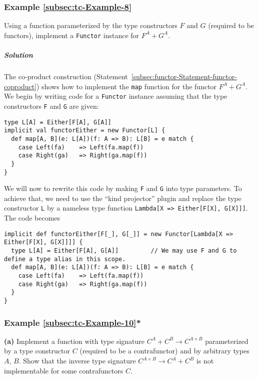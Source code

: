 \subsubsection{Example \label{subsec:tc-Example-8}\ref{subsec:tc-Example-8}}

Using a function parameterized by the type constructors $F$ and $G$
(required to be functors), implement a \lstinline!Functor! instance
for $F^{A}+G^{A}$.

\subparagraph{Solution}

The co-product construction (Statement~\ref{subsec:functor-Statement-functor-coproduct})
shows how to implement the \lstinline!map! function for the functor
$F^{A}+G^{A}$. We begin by writing code for a \lstinline!Functor!
instance assuming that the type constructors \lstinline!F! and \lstinline!G!
are given:
\begin{lstlisting}
type L[A] = Either[F[A], G[A]]
implicit val functorEither = new Functor[L] {
  def map[A, B](e: L[A])(f: A => B): L[B] = e match {
    case Left(fa)    => Left(fa.map(f))
    case Right(ga)   => Right(ga.map(f))
  }
}
\end{lstlisting}
We will now to rewrite this code by making \lstinline!F! and \lstinline!G!
into type parameters. To achieve that, we need to use the \textsf{``}kind
projector\textsf{''} plugin and replace
the type constructor \lstinline!L! by a nameless type function \lstinline!Lambda[X => Either[F[X], G[X]]]!.
The code becomes
\begin{lstlisting}
implicit def functorEither[F[_], G[_]] = new Functor[Lambda[X => Either[F[X], G[X]]]] {
  type L[A] = Either[F[A], G[A]]         // We may use F and G to define a type alias in this scope.
  def map[A, B](e: L[A])(f: A => B): L[B] = e match {
    case Left(fa)    => Left(fa.map(f))
    case Right(ga)   => Right(ga.map(f))
  }
}
\end{lstlisting}


\subsubsection{Example \label{subsec:tc-Example-10}\ref{subsec:tc-Example-10}{*}}

\textbf{(a)} Implement a function with type signature $C^{A}+C^{B}\rightarrow C^{A\times B}$
parameterized by a type constructor $C$ (required to be a contrafunctor)
and by arbitrary types $A$, $B$. Show that the inverse type signature
$C^{A\times B}\rightarrow C^{A}+C^{B}$ is not implementable for some
contrafunctors $C$.

